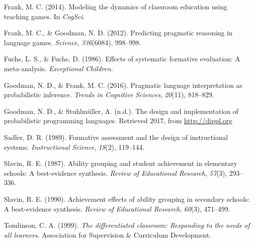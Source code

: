 \documentclass[10pt, letterpaper]{article}
\begin{document}
\hypertarget{ref-frank2014}{}
Frank, M. C. (2014). Modeling the dynamics of classroom education using
teaching games. In \emph{CogSci}.

\hypertarget{ref-frank2012}{}
Frank, M. C., \& Goodman, N. D. (2012). Predicting pragmatic reasoning
in language games. \emph{Science}, \emph{336}(6084), 998--998.

\hypertarget{ref-fuchs1986}{}
Fuchs, L. S., \& Fuchs, D. (1986). Effects of systematic formative
evaluation: A meta-analysis. \emph{Exceptional Children}.

\hypertarget{ref-goodman2016}{}
Goodman, N. D., \& Frank, M. C. (2016). Pragmatic language
interpretation as probabilistic inference. \emph{Trends in Cognitive
Sciences}, \emph{20}(11), 818--829.

\hypertarget{ref-goodman2017}{}
Goodman, N. D., \& Stuhlmüller, A. (n.d.). The design and implementation
of probabilistic programming languages. Retrieved 2017, from
\url{http://dippl.org}

\hypertarget{ref-sadler1989}{}
Sadler, D. R. (1989). Formative assessment and the design of
instructional systems. \emph{Instructional Science}, \emph{18}(2),
119--144.

\hypertarget{ref-slavin1987}{}
Slavin, R. E. (1987). Ability grouping and student achievement in
elementary schools: A best-evidence synthesis. \emph{Review of
Educational Research}, \emph{57}(3), 293--336.

\hypertarget{ref-slavin1990}{}
Slavin, R. E. (1990). Achievement effects of ability grouping in
secondary schools: A best-evidence synthesis. \emph{Review of
Educational Research}, \emph{60}(3), 471--499.

\hypertarget{ref-tomlinson1999}{}
Tomlinson, C. A. (1999). \emph{The differentiated classroom: Responding
to the needs of all learners}. Association for Supervision \& Curriculum
Development.
\end{document}
